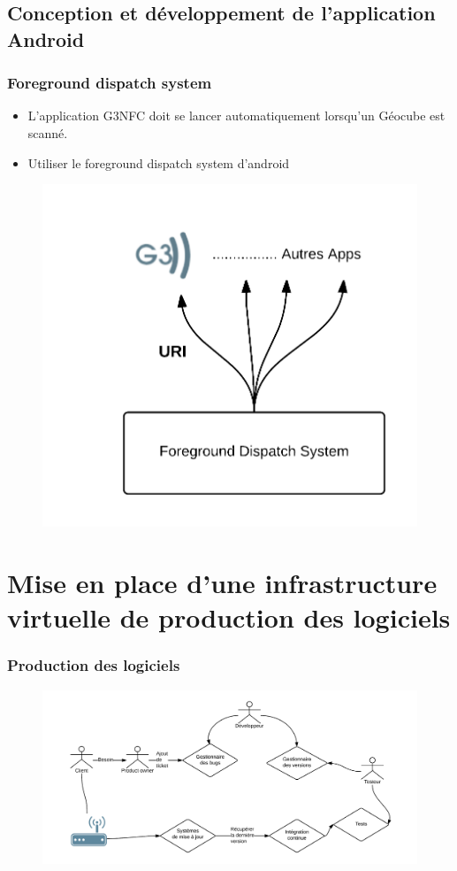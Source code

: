 \documentclass{beamer}
\begin{document}
\subsection{Conception et développement de l'application Android}
\begin{frame}
\frametitle{Foreground dispatch system}
\begin{itemize}
\item L'application G3NFC doit se lancer automatiquement lorsqu'un Géocube est scanné.
\item Utiliser le foreground dispatch system d'android
\end{itemize}
\begin{figure}
\centering
\includegraphics[scale=0.6]{images/foreground.png}

\end{figure}
\end{frame}

\section{Mise en place d'une infrastructure virtuelle de production des logiciels}
\begin{frame}
\frametitle{Production des logiciels}
\begin{figure}
\centering
\includegraphics[scale=0.6]{images/fig3.png}
\end{figure}
\end{frame}
\end{document}
